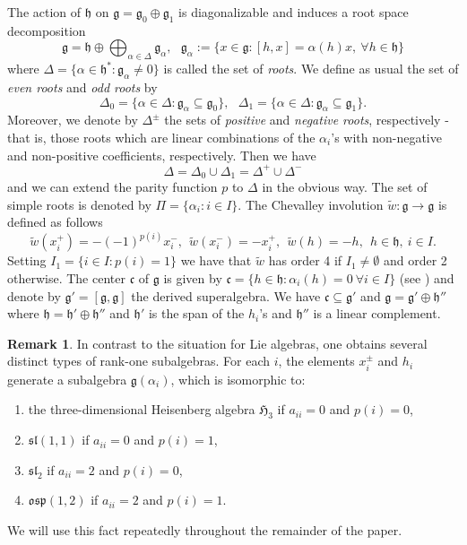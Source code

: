 \documentclass[11pt,reqno]{amsart}
\theoremstyle{plain}
\theoremstyle{definition}
\newtheorem*{rem}{Remark}
\theoremstyle{remark}
\newcommand{\lie}[1]{\mathfrak{#1}}
\numberwithin{equation}{section}
\begin{document}
The action of $\lie h$ on $\lie{g}=\lie g_0\oplus \lie g_1$ is diagonalizable and induces a root space decomposition 
$$\lie g=\lie h \oplus \bigoplus_{\alpha\in \Delta} \lie g_{\alpha},\ \ \ \lie g_{\alpha}:=\{x\in \lie g: [h,x]=\alpha(h)x,\ \forall h\in \lie h\}$$
where $\Delta=\{\alpha\in \lie h^{*}: \lie g_{\alpha}\neq 0 \}$ is called the set of \textit{roots}. We define as usual the set of \textit{even roots} and \textit{odd roots} by 
$$\Delta_0=\{\alpha\in \Delta: \lie g_{\alpha}\subseteq \lie g_0\},\ \ \  \Delta_1=\{\alpha\in \Delta: \lie g_{\alpha}\subseteq \lie g_1\}.$$
Moreover, we denote by $\Delta^{\pm}$ the sets of \textit{positive} and \textit{negative roots}, respectively - that is, those roots which are linear combinations of the $\alpha_i$'s with non-negative and non-positive coefficients, respectively. Then we have
$$\Delta=\Delta_0\cup \Delta_1=\Delta^+\cup \Delta^-$$
and we can extend the parity function $p$ to $\Delta$ in the obvious way. 
The set of simple roots is denoted by $\Pi=\{\alpha_i:i\in I\}$. The Chevalley involution $\tilde{w}:\lie g\rightarrow \lie g$ is defined as follows
$$\tilde{w}(x_i^{+})=-(-1)^{p(i)}x_i^{-},\ \ \tilde{w}(x_i^{-})=-x_i^{+},\ \ \tilde{w}(h)=-h,\ \ h\in \lie h,\ i\in I.$$
Setting $I_1=\{i\in I: p(i)=1\}$ we have that $\tilde{w}$ has order 4 if $I_1\neq \emptyset$ and order 2 otherwise. The center $\mathfrak{c}$ of $\lie g$ is given by $\mathfrak{c}=\{h\in \mathfrak{h}: \alpha_i(h)=0\ \forall i\in I\}$ (see \cite[Section 2.5]{vander89Classification}) and denote by $\lie g'=[\lie g,\lie g]$ the derived superalgebra. We have $\mathfrak{c}\subseteq \mathfrak{g}'$ and $\mathfrak{g}=\mathfrak{g}'\oplus \lie h''$ where $\lie h=\lie h'\oplus \lie h''$ and $\lie h'$ is the span of the $h_i$'s and $\lie h''$ is a linear complement.
\begin{rem}\label{rank1}
In contrast to the situation for Lie algebras, one obtains several distinct types of rank-one subalgebras.
For each $i$, the elements $x_i^{\pm}$ and $h_i$ generate a subalgebra $\mathfrak{g}(\alpha_i)$, which is isomorphic to:
\begin{enumerate}
\item[$\Diamond$] the three-dimensional Heisenberg algebra $\mathfrak{H}_3$ if $a_{ii}=0$ and $p(i)=0$,
\item[$\Diamond$] $\mathfrak{sl}(1,1)$ if $a_{ii}=0$ and $p(i)=1$,
\item[$\Diamond$] $\mathfrak{sl}_2$ if $a_{ii}=2$ and $p(i)=0$,
\item[$\Diamond$] $\mathfrak{osp}(1,2)$ if $a_{ii}=2$ and $p(i)=1$.
\end{enumerate}
We will use this fact repeatedly throughout the remainder of the paper.
\end{rem}
\end{document}
